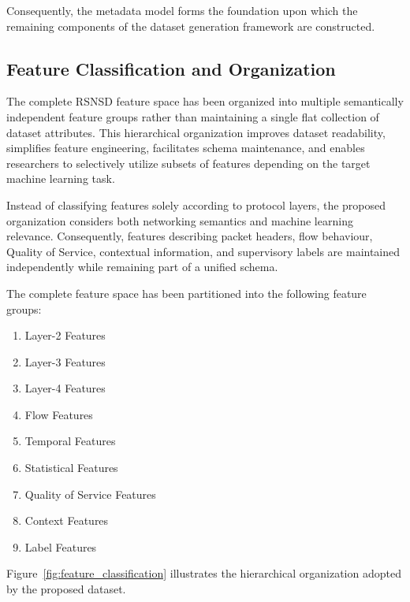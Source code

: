 \documentclass[12pt,a4paper]{article}
\begin{document}
Consequently, the metadata model forms the foundation upon which the remaining components of the dataset generation framework are constructed.

\subsection{Feature Classification and Organization}

The complete RSNSD feature space has been organized into multiple semantically independent feature groups rather than maintaining a single flat collection of dataset attributes. This hierarchical organization improves dataset readability, simplifies feature engineering, facilitates schema maintenance, and enables researchers to selectively utilize subsets of features depending on the target machine learning task.

Instead of classifying features solely according to protocol layers, the proposed organization considers both networking semantics and machine learning relevance. Consequently, features describing packet headers, flow behaviour, Quality of Service, contextual information, and supervisory labels are maintained independently while remaining part of a unified schema.

The complete feature space has been partitioned into the following feature groups:

\begin{enumerate}
	
	\item Layer-2 Features
	
	\item Layer-3 Features
	
	\item Layer-4 Features
	
	\item Flow Features
	
	\item Temporal Features
	
	\item Statistical Features
	
	\item Quality of Service Features
	
	\item Context Features
	
	\item Label Features
	
\end{enumerate}

Figure~\ref{fig:feature_classification} illustrates the hierarchical organization adopted by the proposed dataset.
\end{document}
